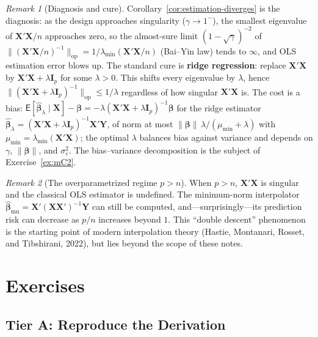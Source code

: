 \documentclass[14pt]{extarticle}
\theoremstyle{plain}
\theoremstyle{definition}
\theoremstyle{remark}
\newtheorem*{remark}{Remark}
\newcommand\expc{\mathsf{E}}
\newcommand{\bX}{\mathbf{X}}
\newcommand{\bY}{\mathbf{Y}}
\def\bb{\boldsymbol{\beta}}
\newcommand{\bI}{\mathbf{I}}
\newcommand{\hbb}{\hat{\boldsymbol{\beta}}}
\newcommand{\opnorm}[1]{\|#1\|_{\mathrm{op}}}
\begin{document}
\begin{remark}[Diagnosis and cure]
Corollary~\ref{cor:estimation-diverges} is the diagnosis: as the design approaches singularity ($\gamma \to 1^-$), the smallest eigenvalue of $\bX'\bX/n$ approaches zero, so the almost-sure limit $(1-\sqrt\gamma)^{-2}$ of $\opnorm{(\bX'\bX/n)^{-1}} = 1/\lambda_{\min}(\bX'\bX/n)$ (Bai--Yin law) tends to $\infty$, and OLS estimation error blows up. The standard cure is \textbf{ridge regression}: replace $\bX'\bX$ by $\bX'\bX + \lambda\bI_p$ for some $\lambda > 0$. This shifts every eigenvalue by $\lambda$, hence $\opnorm{(\bX'\bX + \lambda\bI_p)^{-1}} \leqslant 1/\lambda$ regardless of how singular $\bX'\bX$ is. The cost is a bias: $\expc[\hbb_\lambda \mid \bX] - \bb = -\lambda(\bX'\bX + \lambda\bI_p)^{-1}\bb$ for the ridge estimator $\hbb_\lambda = (\bX'\bX + \lambda\bI_p)^{-1}\bX'\bY$, of norm at most $\|\bb\|\,\lambda/(\mu_{\min} + \lambda)$ with $\mu_{\min} = \lambda_{\min}(\bX'\bX)$; the optimal $\lambda$ balances bias against variance and depends on $\gamma$, $\|\bb\|$, and $\sigma_\varepsilon^2$. The bias--variance decomposition is the subject of Exercise~\ref{ex:mC2}.
\end{remark}

\begin{remark}[The overparametrized regime $p > n$]
When $p > n$, $\bX'\bX$ is singular and the classical OLS estimator is undefined. The minimum-norm interpolator $\hbb_{\mathrm{mn}} = \bX'(\bX\bX')^{-1}\bY$ can still be computed, and---surprisingly---its prediction risk can decrease as $p/n$ increases beyond $1$. This ``double descent'' phenomenon is the starting point of modern interpolation theory (Hastie, Montanari, Rosset, and Tibshirani, 2022), but lies beyond the scope of these notes.
\end{remark}

\section{Exercises}\label{sec:modern-exercises}

\setcounter{exercise}{0}

\subsection*{Tier A: Reproduce the Derivation}
\end{document}

